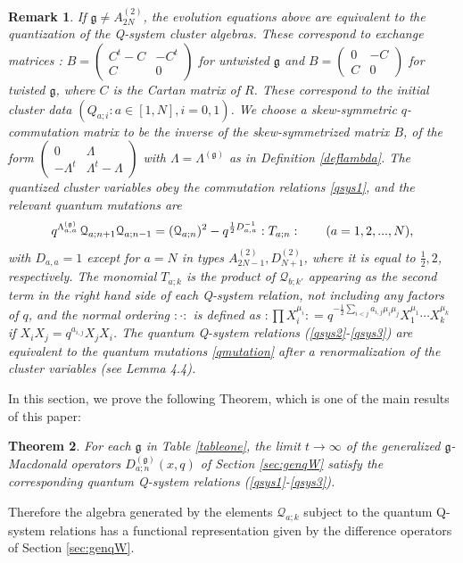 \documentclass[12pt]{amsart}
\newtheorem{thm}{Theorem}[section]
\newtheorem{remark}[thm]{Remark}
\newcommand{\g}{{\mathfrak{g}}}
\newcommand{\Q}{{\mathcal Q}}
\newcommand{\lL}{{\Lambda}}
\newcommand{\half}{\frac{1}{2}}
\numberwithin{equation}{section}
\begin{document}
\begin{remark}\label{qsyscalgrem} If $\g\neq A_{2N}^{(2)}$, the evolution equations above 
are equivalent to the quantization of the Q-system
cluster algebras. These correspond to exchange matrices \cite{clusK,clusDFK,Williams}:
$B=\begin{pmatrix} C^{t}-C& -C^{t} \\ C & 0 \end{pmatrix}$ for untwisted $\g$ and
$B=\begin{pmatrix} 0 & -C \\ C & 0 \end{pmatrix}$ for twisted $\g$, where $C$ is the Cartan matrix of $R$. These correspond to the initial cluster data $(Q_{a;i}: a\in[1,N], i=0,1)$.
We choose a skew-symmetric $q$-commutation matrix to be the inverse of the skew-symmetrized matrix $B$,
%
%
%
%
%
%
of the form $\begin{pmatrix} 0 & \Lambda \\ -\Lambda^{t} & \Lambda^{t}-\Lambda\end{pmatrix}$ with
%
%
%
 $\lL=\lL^{(\g)}$ as in Definition \ref{deflambda}. 
The quantized cluster variables obey the commutation relations \eqref{qsys1}, and 
the relevant quantum mutations \cite{clusDFK} are
\begin{equation}\label{qmutation} q^{\Lambda^{(\g)}_{a,a}}\, \Q_{a;n+1}\Q_{a;n-1}= (\Q_{a;n})^2- q^{\half D_{a,a}^{-1}} : \mathcal \mathcal T_{a;n} : \qquad (a=1,2,...,N), \end{equation}
with $D_{a,a}=1$ except for $a=N$ in types $A_{2N-1}^{(2)}, D_{N+1}^{(2)}$, where it is equal to $\half, 2$, respectively. The monomial $T_{a;k}$ is the product of $\Q_{b;k'}$ appearing as the second term in the right hand side of each Q-system relation, not including any factors of $q$,
%
%
%
%
%
%
%
%
%
%
%
and the normal ordering $: \cdot :$ is defined as
$:\prod X_i^{\mu_i}{:} = q^{-\half\sum_{i<j} a_{i,j}\mu_i\mu_j}  X_{1}^{\mu_1} \cdots X_k^{\mu_k}$ if
 $X_iX_j=q^{a_{i,j}}X_jX_i$.
The  quantum Q-system relations (\ref{qsys2}-\ref{qsys3}) are equivalent to the quantum mutations \eqref{qmutation} after a renormalization of the cluster variables
%
(see \cite{DFKconj} Lemma 4.4).
\end{remark}

In this section, we prove the following Theorem, which is one of the main results of this paper:
\begin{thm}\label{Qsysconj} For each $\g$ in Table \ref{tableone}, 
%
the limit $t\to\infty$ of the generalized $\g$-Macdonald operators $D_{a;n}^{(\g)}(x,q)$ of Section \ref{sec:genqW} satisfy the corresponding quantum Q-system relations (\ref{qsys1}-\ref{qsys3}).
\end{thm}
Therefore the algebra generated by the elements $\Q_{a;k}$ subject to the quantum Q-system relations has a functional representation given by the difference operators of Section \ref{sec:genqW}.
\end{document}

